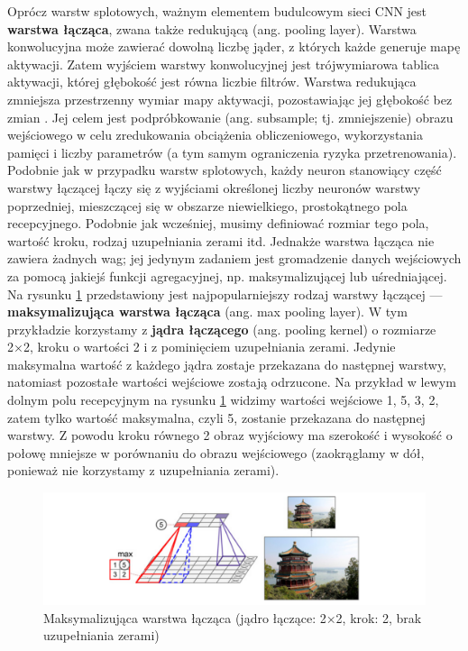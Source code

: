 \documentclass[12pt]{mwbk}
\theoremstyle{plain}
\theoremstyle{definition}
\theoremstyle{remark}
\newcommand\zrodlo[1]{\par\vspace{-3mm}{\small\textit{Źródło: }#1 }}
\begin{document}
Oprócz warstw splotowych, ważnym elementem budulcowym sieci CNN jest \textbf{warstwa łącząca}, zwana także redukującą (ang. pooling layer). Warstwa konwolucyjna może zawierać dowolną liczbę jąder, z których każde generuje mapę aktywacji. Zatem wyjściem warstwy konwolucyjnej jest trójwymiarowa tablica aktywacji, której głębokość jest równa liczbie filtrów. Warstwa redukująca zmniejsza przestrzenny wymiar mapy aktywacji, pozostawiając jej głębokość bez zmian \cite{illustrated}. Jej celem jest podpróbkowanie
(ang. subsample; tj. zmniejszenie) obrazu wejściowego w celu zredukowania obciążenia obliczeniowego,
wykorzystania pamięci i liczby parametrów (a tym samym ograniczenia ryzyka przetrenowania).
Podobnie jak w przypadku warstw splotowych, każdy neuron stanowiący część warstwy łączącej
łączy się z wyjściami określonej liczby neuronów warstwy poprzedniej, mieszczącej się w obszarze
niewielkiego, prostokątnego pola recepcyjnego. Podobnie jak wcześniej, musimy definiować 
rozmiar tego pola, wartość kroku, rodzaj uzupełniania zerami itd. Jednakże warstwa łącząca nie zawiera
żadnych wag; jej jedynym zadaniem jest gromadzenie danych wejściowych za pomocą jakiejś funkcji agregacyjnej, np. maksymalizującej lub uśredniającej. Na rysunku \ref{fig:max-pooling-layer} przedstawiony jest najpopularniejszy
rodzaj warstwy łączącej — \textbf{maksymalizująca warstwa łącząca} (ang. max pooling layer). W tym przykładzie korzystamy z \textbf{jądra łączącego}  (ang. pooling kernel) o rozmiarze 2×2, kroku o wartości 2 i z pominięciem uzupełniania zerami. Jedynie maksymalna wartość z każdego jądra zostaje przekazana do następnej warstwy, natomiast pozostałe wartości wejściowe zostają odrzucone. Na przykład w lewym dolnym polu recepcyjnym na rysunku \ref{fig:max-pooling-layer} widzimy wartości wejściowe 1, 5, 3, 2, zatem tylko wartość maksymalna, czyli 5, zostanie przekazana do następnej warstwy. Z powodu kroku równego 2 obraz wyjściowy ma szerokość i wysokość o połowę mniejsze w porównaniu do obrazu wejściowego (zaokrąglamy  w dół, ponieważ nie korzystamy z uzupełniania zerami).

\begin{figure}[!h]
	\centering
	\includegraphics[width=\linewidth]{rys/max_pooling_layer.png}
	\caption{Maksymalizująca warstwa łącząca (jądro łączące: 2×2, krok: 2, brak uzupełniania zerami)}
	\zrodlo{\cite{geron}}
	\label{fig:max-pooling-layer}
\end{figure}
\end{document}
